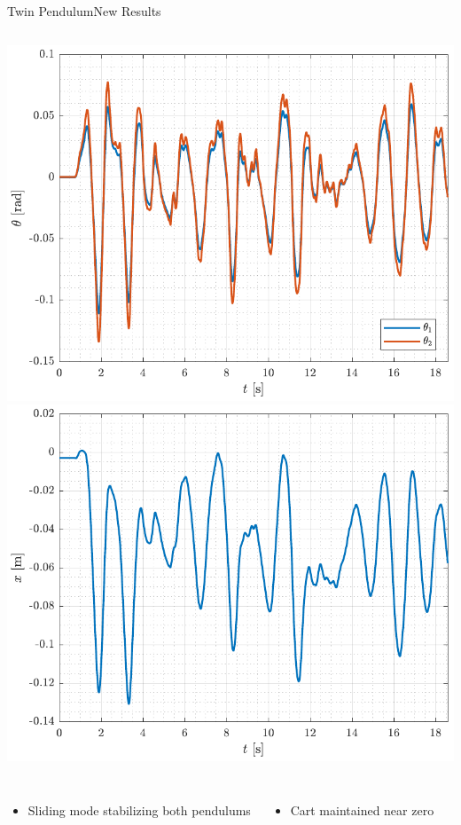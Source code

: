 
\begin{frame}{Twin Pendulum}{New Results}
  \begin{columns}[c]
      \includegraphics[width=1\textwidth]{figures/thetaCatch}
      \includegraphics[width=1\textwidth]{figures/xCatch}
  \end{columns}
  \begin{columns}[c]
    \begin{itemize}\vspace{12pt}
      \item Sliding mode stabilizing both pendulums
    \end{itemize}
    \begin{itemize}\centering
      \item Cart maintained near zero
    \end{itemize}
  \end{columns}
\end{frame}

